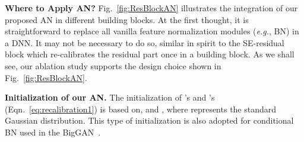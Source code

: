 \documentclass[runningheads]{llncs}
\newcommand{\eg}{\emph{e.g.}}
\begin{document}
\textbf{Where to Apply AN?} Fig.~\ref{fig:ResBlockAN} illustrates the integration of our proposed AN in different building blocks. At the first thought, it is straightforward to replace all vanilla feature normalization modules (\eg, BN) in a DNN. It may not be necessary to do so, similar in spirit to the SE-residual block which re-calibrates the residual part once in a building block. As we shall see, our ablation study supports the design choice shown in Fig.~\ref{fig:ResBlockAN}.     

\textbf{Initialization of our AN.} The initialization of 's and 's (Eqn.~\ref{eq:recalibration1}) is based on,  and , where  represents the standard Gaussian distribution. This type of initialization is also adopted for conditional BN used in the BigGAN~\cite{BigGAN}. 
\end{document}
